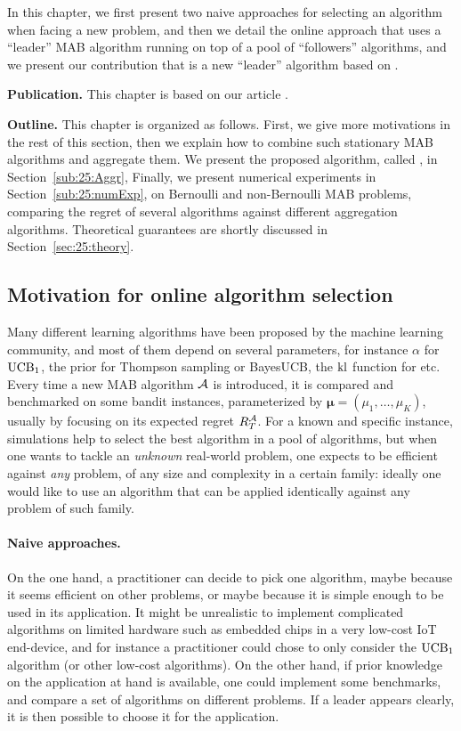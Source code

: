 In this chapter, we first present two naive approaches for selecting an algorithm when facing a new problem, and then we detail the online approach that uses a ``leader'' MAB algorithm running on top of a pool of ``followers'' algorithms, and we present our contribution that is a new ``leader'' algorithm based on \ExpQ.


\textbf{Publication.}
%
This chapter is based on our article \cite{Besson2018WCNC}.


\textbf{Outline.}
%
This chapter is organized as follows.
First, we give more motivations in the rest of this section, then we explain how to combine such stationary MAB algorithms and aggregate them.
We present the proposed algorithm, called \Aggr, in Section~\ref{sub:25:Aggr},
Finally, we present numerical experiments in Section~\ref{sub:25:numExp},
on Bernoulli and non-Bernoulli MAB problems,
comparing the regret of several algorithms against different aggregation algorithms.
Theoretical guarantees are shortly discussed in Section~\ref{sec:25:theory}.


\subsection{Motivation for online algorithm selection}\label{sub:25:introduction}

Many different learning algorithms have been proposed by the machine learning community,
and most of them depend on several parameters, for instance $\alpha$ for $\mathrm{UCB}_1$, the prior for Thompson sampling or BayesUCB,
the $\mathrm{kl}$ function for \klUCB{} etc.
Every time a new MAB algorithm $\mathcal{A}$ is introduced, it is compared and benchmarked on some bandit instances, parameterized by $\boldsymbol{\mu} = (\mu_1,\dots,\mu_K)$, usually by focusing on its expected regret $R_T^{\mathcal{A}}$.
%
For a known and specific instance, simulations help to select the best algorithm in a pool of algorithms,
but when one wants to tackle an \emph{unknown} real-world problem, one expects to be efficient against \emph{any} problem, of any size and complexity in a certain family:
ideally one would like to use an algorithm that can be applied identically against any problem of such family.


\paragraph{Naive approaches.}
%
On the one hand, a practitioner can decide to pick one algorithm, maybe because it seems efficient on other problems, or maybe because it is simple enough to be used in its application. It might be unrealistic to implement complicated algorithms on limited hardware such as embedded chips in a very low-cost IoT end-device, and for instance a practitioner could chose to only consider the $\mathrm{UCB}_1$ algorithm (or other low-cost algorithms).
%
On the other hand, if prior knowledge on the application at hand is available, one could implement some benchmarks, and compare a set of algorithms on different problems. If a leader appears clearly, it is then possible to choose it for the application.


